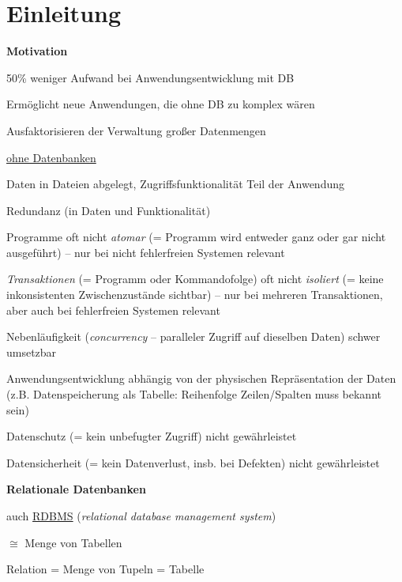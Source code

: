 \section{Einleitung}
\label{sec:einleitung}

\textbf{Motivation}
\begin{items}
  \item 50\% weniger Aufwand bei Anwendungsentwicklung mit DB
  \item Ermöglicht neue Anwendungen, die ohne DB zu komplex wären
  \item Ausfaktorisieren der Verwaltung großer Datenmengen
  \item \underline{ohne Datenbanken}
  \begin{items}
    \item Daten in Dateien abgelegt, Zugriffsfunktionalität Teil der Anwendung
    \item Redundanz (in Daten und Funktionalität)
    \item Programme oft nicht \emph{atomar} (= Programm wird entweder ganz oder gar nicht ausgeführt) -- nur bei nicht fehlerfreien Systemen relevant
    \item \emph{Transaktionen} (= Programm oder Kommandofolge) oft nicht \emph{isoliert} (= keine inkonsistenten Zwischenzustände sichtbar) -- nur bei mehreren Transaktionen, aber auch bei fehlerfreien Systemen relevant
    \item Nebenläufigkeit (\emph{concurrency} -- paralleler Zugriff auf dieselben Daten) schwer umsetzbar
    \item Anwendungsentwicklung abhängig von der physischen Repräsentation der Daten (z.B. Datenspeicherung als Tabelle: Reihenfolge Zeilen/Spalten muss bekannt sein)
    \item Datenschutz (= kein unbefugter Zugriff) nicht gewährleistet
    \item Datensicherheit (= kein Datenverlust, insb. bei Defekten) nicht gewährleistet
   \end{items}
\end{items}

\textbf{Relationale Datenbanken}
\begin{items}
  \item auch \underline{RDBMS} (\emph{relational database management system})
  \item \( \cong \) Menge von Tabellen
  \item Relation = Menge von Tupeln = Tabelle
\end{items}

